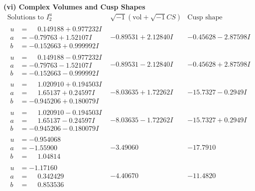 \documentclass[1p]{elsarticle_modified}
\theoremstyle{definition}
\newcommand{\I}{\sqrt{-1}}
\begin{document}
\newpage\flushleft \textbf{(vi) Complex Volumes and Cusp Shapes}
$$\begin{array}{c|c|c}  
\text{Solutions to }I^u_{2}& \I (\text{vol} + \sqrt{-1}CS) & \text{Cusp shape}\\
 \hline 
\begin{aligned}
u &= \phantom{-}0.149188 + 0.977232 I \\
a &= -0.79763 + 1.52107 I \\
b &= -0.152663 + 0.999992 I\end{aligned}
 & -0.89531 + 2.12840 I & -0.45628 - 2.87598 I \\ \hline\begin{aligned}
u &= \phantom{-}0.149188 - 0.977232 I \\
a &= -0.79763 - 1.52107 I \\
b &= -0.152663 - 0.999992 I\end{aligned}
 & -0.89531 - 2.12840 I & -0.45628 + 2.87598 I \\ \hline\begin{aligned}
u &= \phantom{-}1.020910 + 0.194503 I \\
a &= \phantom{-}1.65137 + 0.24597 I \\
b &= -0.945206 + 0.180079 I\end{aligned}
 & -8.03635 + 1.72262 I & -15.7327 - 0.2949 I \\ \hline\begin{aligned}
u &= \phantom{-}1.020910 - 0.194503 I \\
a &= \phantom{-}1.65137 - 0.24597 I \\
b &= -0.945206 - 0.180079 I\end{aligned}
 & -8.03635 - 1.72262 I & -15.7327 + 0.2949 I \\ \hline\begin{aligned}
u &= -0.954068\phantom{ +0.000000I} \\
a &= -1.55900\phantom{ +0.000000I} \\
b &= \phantom{-}1.04814\phantom{ +0.000000I}\end{aligned}
 & -3.49060\phantom{ +0.000000I} & -17.7910\phantom{ +0.000000I} \\ \hline\begin{aligned}
u &= -1.17160\phantom{ +0.000000I} \\
a &= \phantom{-}0.342429\phantom{ +0.000000I} \\
b &= \phantom{-}0.853536\phantom{ +0.000000I}\end{aligned}
 & -4.40670\phantom{ +0.000000I} & -11.4820\phantom{ +0.000000I} \\ \hline\begin{aligned}

\end{aligned}
\end{array}$$
\end{document}
